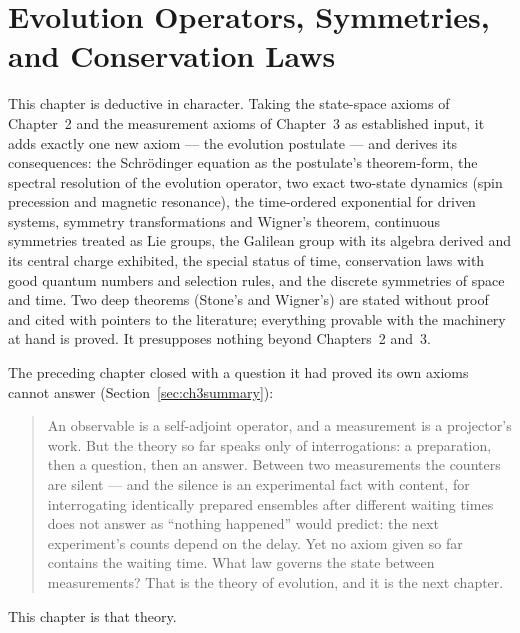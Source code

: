 \chapter{Evolution Operators, Symmetries, and Conservation Laws}

\begin{note}
    This chapter is deductive in character. Taking the state-space axioms of Chapter~2 and the measurement axioms of Chapter~3 as established input, it adds exactly one new axiom --- the evolution postulate --- and derives its consequences: the Schr\"odinger equation as the postulate's theorem-form, the spectral resolution of the evolution operator, two exact two-state dynamics (spin precession and magnetic resonance), the time-ordered exponential for driven systems, symmetry transformations and Wigner's theorem, continuous symmetries treated as Lie groups, the Galilean group with its algebra derived and its central charge exhibited, the special status of time, conservation laws with good quantum numbers and selection rules, and the discrete symmetries of space and time. Two deep theorems (Stone's and Wigner's) are stated without proof and cited with pointers to the literature; everything provable with the machinery at hand is proved. It presupposes nothing beyond Chapters~2 and~3.
\end{note}

The preceding chapter closed with a question it had proved its own axioms cannot answer (Section~\ref{sec:ch3summary}):
\begin{quote}
    An observable is a self-adjoint operator, and a measurement is a projector's work. But the theory so far speaks only of interrogations: a preparation, then a question, then an answer. Between two measurements the counters are silent --- and the silence is an experimental fact with content, for interrogating identically prepared ensembles after different waiting times does not answer as ``nothing happened'' would predict: the next experiment's counts depend on the delay. Yet no axiom given so far contains the waiting time. What law governs the state between measurements? That is the theory of evolution, and it is the next chapter.
\end{quote}
This chapter is that theory.

